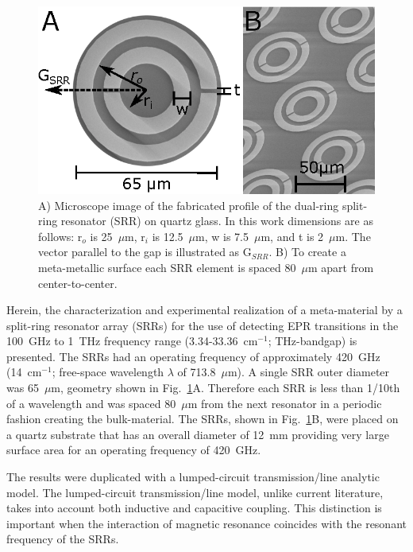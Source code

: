 \begin{figure}[htpb]
\centering
  \includegraphics{Kapitel/Ch3-Images/01-Measurements.eps}%
  \caption[Microscope image of the SRR geometry.]{ A) Microscope image of the fabricated profile of the dual-ring split-ring resonator (SRR) on quartz glass. In this work dimensions are as follows: r$_o$ is 25~$\mu$m, r$_i$ is 12.5~$\mu$m, w is 7.5~$\mu$m, and t is 2~$\mu$m. The vector parallel to the gap is illustrated as G$_{SRR}$. B) To create a meta-metallic surface each SRR element is spaced 80~$\mu$m apart from center-to-center.}
  \label{ch3-fig:sizes}
\end{figure}

Herein, the characterization and experimental realization of a meta-material by a split-ring resonator array (SRRs) for the use of detecting EPR transitions in the 100~GHz to 1~THz frequency range (3.34-33.36~cm$^{-1}$; THz-bandgap) is presented. The SRRs had an operating frequency of approximately 420~GHz (14~cm$^{-1}$; free-space wavelength $\lambda$ of 713.8~$\mu$m). A single SRR outer diameter was 65~$\mu$m, geometry shown in Fig.~\ref{ch3-fig:sizes}A. Therefore each SRR is less than 1/10th of a wavelength and was spaced 80~$\mu$m from the next resonator in a periodic fashion creating the bulk-material. The SRRs, shown in Fig.~\ref{ch3-fig:sizes}B, were placed on a quartz substrate that has an overall diameter of 12~mm providing very large surface area for an operating frequency of 420~GHz.

The results were duplicated with a lumped-circuit transmission\-/line analytic model. The lumped-circuit transmission\-/line model, unlike current literature, takes into account both inductive and capacitive coupling. This distinction is important when the interaction of magnetic resonance coincides with the resonant frequency of the SRRs.

